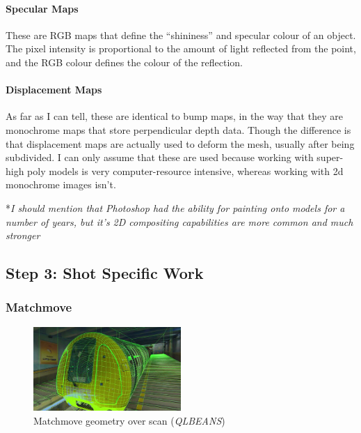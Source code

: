 \hypertarget{specular-maps}{%
\paragraph{Specular Maps}\label{specular-maps}}

These are RGB maps that define the ``shininess'' and specular colour of an object. The pixel intensity is proportional to the amount of light reflected from the point, and the RGB colour defines the colour of the reflection.

\hypertarget{displacement-maps}{%
\paragraph{Displacement Maps}\label{displacement-maps}}

As far as I can tell, these are identical to bump maps, in the way that they are monochrome maps that store perpendicular depth data. Though the difference is that displacement maps are actually used to deform the mesh, usually after being subdivided. I can only assume that these are used because working with super-high poly models is very computer-resource intensive, whereas working with 2d monochrome images isn't.

*\emph{I should mention that Photoshop had the ability for painting onto models for a number of years, but it's 2D compositing capabilities are more common and much stronger}

\hypertarget{step-3-shot-specific-work}{%
\subsection{Step 3: Shot Specific Work}\label{step-3-shot-specific-work}}

\hypertarget{matchmove}{%
\subsubsection{Matchmove}\label{matchmove}}

\begin{figure}
\includegraphics[width=0.5\textwidth,height=\textheight]{./images/matchmove.png}
\caption{Matchmove geometry over scan (\emph{QLBEANS})}
\end{figure}

